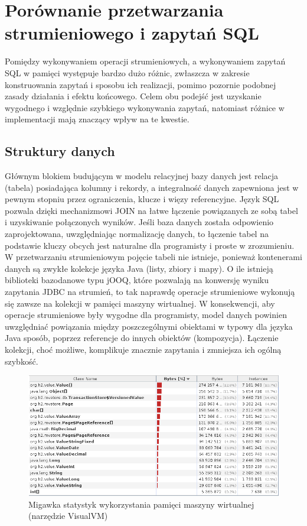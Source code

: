 \documentclass[12pt,twoside,openright]{extarticle}
\begin{document}
\cleardoublepage
\section{Porównanie przetwarzania strumieniowego i zapytań SQL}

    Pomiędzy wykonywaniem operacji strumieniowych, a wykonywaniem zapytań SQL w pamięci występuje bardzo dużo różnic, zwłaszcza w zakresie konstruowania zapytań i sposobu ich realizacji, pomimo pozornie podobnej zasady działania i efektu końcowego. Celem obu podejść jest uzyskanie wygodnego i względnie szybkiego wykonywania zapytań, natomiast różnice w implementacji mają znaczący wpływ na te kwestie.

\subsection{Struktury danych}

    Głównym blokiem budującym w modelu relacyjnej bazy danych jest relacja (tabela) posiadająca kolumny i rekordy, a integralność danych zapewniona jest w pewnym stopniu przez ograniczenia, klucze i więzy referencyjne. Język SQL pozwala dzięki mechanizmowi JOIN na łatwe łączenie powiązanych ze sobą tabel i uzyskiwanie połączonych wyników. Jeśli baza danych została odpowienio zaprojektowana, uwzględniając normalizację danych, to łączenie tabel na podstawie kluczy obcych jest naturalne dla programisty i proste w zrozumieniu. W przetwarzaniu strumieniowym pojęcie tabeli nie istnieje, ponieważ kontenerami danych są zwykłe kolekcje języka Java (listy, zbiory i mapy). O ile istnieją biblioteki bazodanowe typu jOOQ, które pozwalają na konwersję wyniku zapytania JDBC na strumień, to tak naprawdę operacje strumieniowe wykonują się zawsze na kolekcji w pamięci maszyny wirtualnej. W konsekwencji, aby operacje strumieniowe były wygodne dla programisty, model danych powinien uwzględniać powiązania między poszczególnymi obiektami w typowy dla języka Java sposób, poprzez referencje do innych obiektów (kompozycja). Łączenie kolekcji, choć możliwe, komplikuje znacznie zapytania i zmniejsza ich ogólną szybkość.

\begin{figure}[h]
\centering
\includegraphics[width=15cm]{jvmmemory}
\caption{Migawka statystyk wykorzystania pamięci maszyny wirtualnej (narzędzie VisualVM)}
\label{fig:jvmmemory}
\end{figure}
\end{document}
